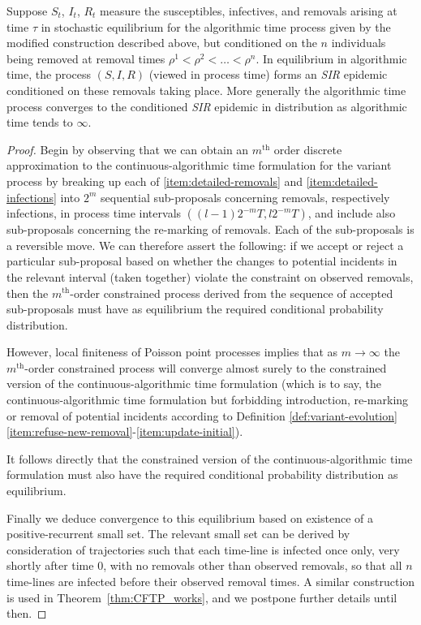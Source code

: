 \documentclass[]{article}
\newcommand{\SIR}{\emph{SIR}\xspace}
\begin{document}
\begin{thm}\label{thm:conditioned-SIR-epidemic}
Suppose \({S}_t\), \({I}_t\), \({R}_t\) measure the susceptibles, infectives, and removals 
arising at time \(\tau\) in stochastic equilibrium for the algorithmic time process given by the modified construction described above,
but conditioned on the \(n\) individuals being removed at removal times \(\rho^1<\rho^2<\ldots<\rho^n\).
In equilibrium in algorithmic time,
the process \(({S}, {I}, {R})\) (viewed in process time) forms an \SIR epidemic conditioned on these removals taking place.
More generally
the algorithmic time process 
converges to the conditioned \SIR epidemic in distribution as algorithmic time tends to \(\infty\).
\end{thm}
\begin{proof}
Begin by observing that we can obtain
an \(m^\text{th}\) order discrete approximation
to the continuous-algorithmic time formulation 
for the variant process by breaking up each of \ref{item:detailed-removals}
and \ref{item:detailed-infections} into \(2^m\) sequential
sub-proposals concerning removals, respectively
infections, in process time intervals
\(((l{-}1)2^{-m}T, l 2^{-m}T)\),
and include also sub-proposals concerning the re-marking of removals. 
Each of the sub-proposals is a reversible move.
We can therefore assert the following:
if we accept or reject a 
particular sub-proposal based on whether the changes to potential
incidents in the relevant interval
(taken together) violate the constraint
on observed removals, then the
\(m^\text{th}\)-order constrained process derived
from the sequence of accepted sub-proposals
must have as equilibrium the required
conditional probability distribution.

However, local finiteness of Poisson point processes implies that as \(m\to\infty\)
the \(m^\text{th}\)-order constrained process will converge almost surely to the constrained version
of the continuous-algorithmic time formulation 
(which is to say,
the continuous-algorithmic time formulation 
but forbidding introduction, re-marking or removal of potential incidents
according to
Definition \ref{def:variant-evolution}\ref{item:refuse-new-removal}-\ref{item:update-initial}).

It follows directly that the constrained version
of the continuous-algorithmic time formulation 
 must also have the required
conditional probability distribution as equilibrium.

Finally we deduce convergence to this
equilibrium based on existence of a 
positive-recurrent small set. 
The relevant small set can be derived by consideration of trajectories such that each time-line is infected once only, 
very shortly after time \(0\), with no removals other than observed removals, so that all \(n\) time-lines are infected before their observed removal times. A similar construction is used in Theorem~\ref{thm:CFTP_works}, and we postpone further details until then.
\end{proof}
\end{document}
